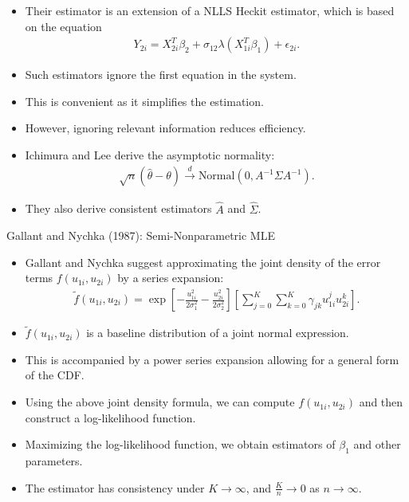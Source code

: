 \documentclass[xcolor=svgnames,dvipdfmx,cjk]{beamer}
\theoremstyle{example}
\def\darrow{\xrightarrow{d}}
\begin{document}
\begin{frame}
      \begin{itemize}
            \item Their estimator is an extension of a NLLS Heckit estimator, which is based on the equation
                  \begin{align*}
                        Y_{2i} = X_{2i}^T \beta_2 + \sigma_{12} \lambda(X_{1i}^T\beta_1) + \epsilon_{2i}.
                  \end{align*}
            \item Such estimators \alert{ignore the first equation in the system}.
            \item This is convenient as it simplifies the estimation.
            \item However, ignoring relevant information \alert{reduces efficiency}.
            \item Ichimura and Lee derive the asymptotic normality:
                  \begin{align*}
                        \sqrt{n}(\hat{\theta} - \theta) \darrow \text{Normal} (0, A^{-1} \Sigma A^{-1}).
                  \end{align*}
            \item They also derive consistent estimators $\hat{A}$ and $\hat{\Sigma}$.
      \end{itemize}
\end{frame}

\begin{frame}{Gallant and Nychka (1987): Semi-Nonparametric MLE}
      \begin{itemize}
            \item Gallant and Nychka suggest approximating the joint density of the error terms 
                  $f(u_{1i}, u_{2i})$ by a series expansion:
                  \begin{align*}
                        \tilde{f}(u_{1i}, u_{2i}) 
                              = \exp \left[
                                          -\frac{u_{1i}^2}{2 \sigma_{1}^2}  -\frac{u_{2i}^2}{2 \sigma_{2}^2} 
                                     \right]
                                \left[
                                    \sum_{j=0}^K \sum_{k=0}^K \gamma_{jk} u_{1i}^j u_{2i}^k
                                \right].
                  \end{align*}
            \item $\tilde{f}(u_{1i}, u_{2i})$ is a baseline distribution of a joint normal expression.
            \item This is accompanied by a power series expansion allowing for a general form of the CDF.
            \item Using the above joint density formula, we can compute $f(u_{1i}, u_{2i})$ and then
                  construct a log-likelihood function.
            \item Maximizing the log-likelihood function, we obtain estimators of $\beta_1$ and other parameters.
            \item The estimator has consistency under $K \to \infty$, and $\frac{K}{n} \to 0$ as $n \to \infty$.
      \end{itemize}
\end{frame}
\end{document}
